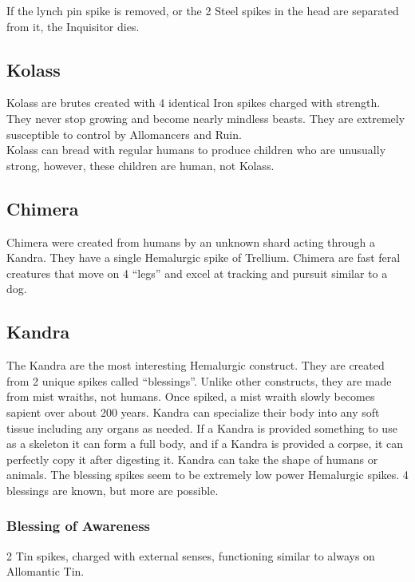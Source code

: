 \documentclass[conference]{IEEEtran}
\newcommand{\n}{\hfill\break}
\begin{document}
If the lynch pin spike is removed, or the 2 Steel spikes in the head are separated from it, the Inquisitor dies.\cite{TFE-CH38}
\subsection*{\textbf{Kolass}}
Kolass are brutes created with 4 identical Iron spikes charged with strength.\cite{WoF}  They never stop growing and become nearly mindless beasts.\cite{WoA-CH19}\cite{WoF}
They are extremely susceptible to control by Allomancers and Ruin.\cite{WoF}\cite{HoA}  \\

Kolass can bread with regular humans to produce children who are unusually strong, however, these children are human, not Kolass.\cite{Allo-jack}
\n
\subsection*{\textbf{Chimera}}
Chimera\cite{chimera} were created from humans by an unknown shard acting through a Kandra.  They have a single Hemalurgic spike of Trellium.
Chimera are fast feral creatures that move on 4 ``legs'' and excel at tracking and pursuit similar to a dog.\cite{SoS-CH21}
\newpage
\subsection*{\textbf{Kandra}}
The Kandra are the most interesting Hemalurgic construct.  They are created from 2 unique spikes called ``blessings''.\cite{WoF}\cite{SoS-CH7}  Unlike other constructs, they are made from mist wraiths, not humans.\cite{WoF}  Once spiked, a mist wraith slowly becomes sapient over about 200 years.\cite{HoA-CH9}\cite{TFE-CH17}  Kandra can specialize their body into any soft tissue including any organs as needed.\cite{HoA-CH2}  If a Kandra is provided something to use as a skeleton it can form a full body, and if a Kandra is provided a corpse, it can perfectly copy it after digesting it.\cite{WoA-CH6}  Kandra can take the shape of humans\cite{TFE-CH5} or animals.\cite{WoA-CH6}
The blessing spikes seem to be extremely low power Hemalurgic spikes.\cite{kandra-blessing}\cite{WoF}  4 blessings are known, but more are possible.
\subsubsection*{\textbf{Blessing of Awareness}}
2 Tin spikes, charged with external senses, functioning similar to always on Allomantic Tin.\cite{WoF}\cite{kandra-blessing}\cite{HE-TB}
\end{document}
